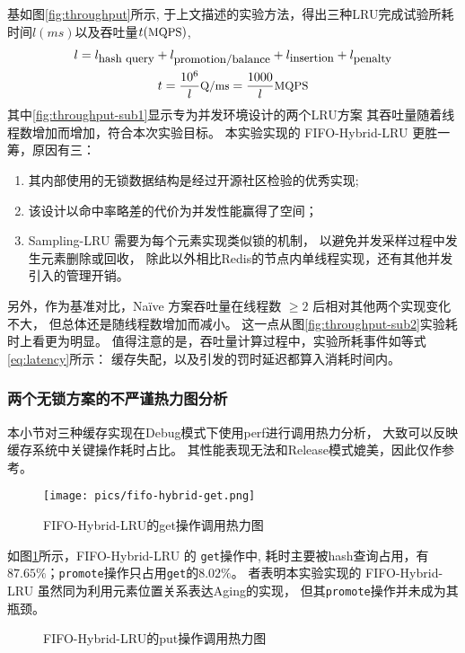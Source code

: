 基如图\ref{fig:throughput}所示, 于上文描述的实验方法，得出三种LRU完成试验所耗时间$l(ms)$以及吞吐量$t(\mbox{\small MQPS})$, 
\begin{gather}
    l = l_{\mbox{\small hash query}} + l_{\mbox{\small promotion/balance}} + l_{\mbox{\small insertion}} + l_{\mbox{\small penalty}} \label{eq:latency}\\
    t = \frac{10^6}{l} \mbox{\small Q/ms} = \frac{1000}{l} \mbox{\small MQPS}
\end{gather}
其中\ref{fig:throughput-sub1}显示专为并发环境设计的两个LRU方案
其吞吐量随着线程数增加而增加，符合本次实验目标。
本实验实现的 FIFO-Hybrid-LRU 更胜一筹，原因有三：
\begin{enumerate}
    \item 其内部使用的无锁数据结构是经过开源社区检验的优秀实现;
    \item 该设计以命中率略差的代价为并发性能赢得了空间；
    \item Sampling-LRU 需要为每个元素实现类似锁的机制，
        以避免并发采样过程中发生元素删除或回收，
        除此以外相比Redis的节点内单线程实现，还有其他并发引入的管理开销。
\end{enumerate}
另外，作为基准对比，Na\"{i}ve 方案吞吐量在线程数 $\geq 2$ 后相对其他两个实现变化不大，
但总体还是随线程数增加而减小。
这一点从图\ref{fig:throughput-sub2}实验耗时上看更为明显。
值得注意的是，吞吐量计算过程中，实验所耗事件如等式\ref{eq:latency}所示： 
缓存失配，以及引发的罚时延迟都算入消耗时间内。

\subsubsection{两个无锁方案的不严谨热力图分析}

本小节对三种缓存实现在Debug模式下使用perf进行调用热力分析，
大致可以反映缓存系统中关键操作耗时占比。
其性能表现无法和Release模式媲美，因此仅作参考。

\begin{figure}
    \centering
    \texttt{[image: pics/fifo-hybrid-get.png]}
    \caption{FIFO-Hybrid-LRU的get操作调用热力图}
    \label{fig:fifo-get}
\end{figure}

如图\ref{fig:fifo-get}所示，FIFO-Hybrid-LRU 的 \verb|get|操作中,
耗时主要被hash查询占用，有$87.65\%$；\verb|promote|操作只占用\verb|get|的$8.02\%$。
者表明本实验实现的 FIFO-Hybrid-LRU 虽然同为利用元素位置关系表达Aging的实现，
但其\verb|promote|操作并未成为其瓶颈。

\begin{figure}
    \centering
    \caption{FIFO-Hybrid-LRU的put操作调用热力图}
    \label{fig:fifo-put}
\end{figure}

